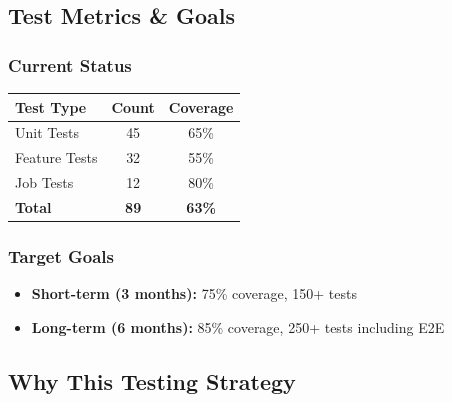 \subsection{Test Metrics \& Goals}

\subsubsection{Current Status}

\begin{center}
\begin{tabular}{@{}lcc@{}}
\toprule
\textbf{Test Type} & \textbf{Count} & \textbf{Coverage} \\
\midrule
Unit Tests & 45 & 65\% \\
Feature Tests & 32 & 55\% \\
Job Tests & 12 & 80\% \\
\textbf{Total} & \textbf{89} & \textbf{63\%} \\
\bottomrule
\end{tabular}
\end{center}

\subsubsection{Target Goals}

\begin{itemize}
    \item \textbf{Short-term (3 months):} 75\% coverage, 150+ tests
    \item \textbf{Long-term (6 months):} 85\% coverage, 250+ tests including E2E
\end{itemize}

\subsection{Why This Testing Strategy}

